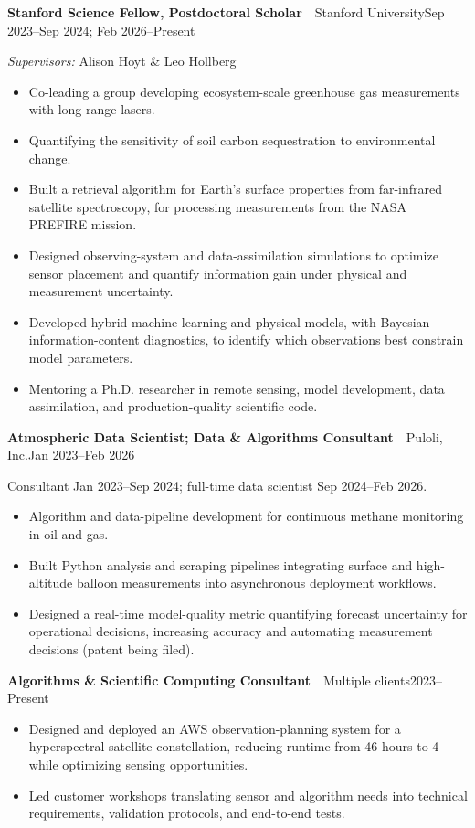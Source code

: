 \documentclass[11pt,letterpaper]{article}
\newcommand{\entry}[3]{\noindent\textbf{#1}~\textbar~#2\hfill{#3}\par}
\begin{document}
\entry{Stanford Science Fellow, Postdoctoral Scholar}{Stanford University}{Sep 2023--Sep 2024; Feb 2026--Present}
\textit{Supervisors:} Alison Hoyt \& Leo Hollberg
\begin{itemize}
  \item Co-leading a group developing ecosystem-scale greenhouse gas measurements with long-range lasers.
  \item Quantifying the sensitivity of soil carbon sequestration to environmental change.
  \item Built a retrieval algorithm for Earth's surface properties from far-infrared satellite spectroscopy, for processing measurements from the NASA PREFIRE mission.
  \item Designed observing-system and data-assimilation simulations to optimize sensor placement and quantify information gain under physical and measurement uncertainty.
  \item Developed hybrid machine-learning and physical models, with Bayesian information-content diagnostics, to identify which observations best constrain model parameters.
  \item Mentoring a Ph.D. researcher in remote sensing, model development, data assimilation, and production-quality scientific code.
\end{itemize}
\vspace{4pt}

\entry{Atmospheric Data Scientist; Data \& Algorithms Consultant}{Puloli, Inc.}{Jan 2023--Feb 2026}
Consultant Jan 2023--Sep 2024; full-time data scientist Sep 2024--Feb 2026.
\begin{itemize}
  \item Algorithm and data-pipeline development for continuous methane monitoring in oil and gas.
  \item Built Python analysis and scraping pipelines integrating surface and high-altitude balloon measurements into asynchronous deployment workflows.
  \item Designed a real-time model-quality metric quantifying forecast uncertainty for operational decisions, increasing accuracy and automating measurement decisions (patent being filed).
\end{itemize}
\vspace{4pt}

\entry{Algorithms \& Scientific Computing Consultant}{Multiple clients}{2023--Present}
\begin{itemize}
  \item Designed and deployed an AWS observation-planning system for a hyperspectral satellite constellation, reducing runtime from 46 hours to 4 while optimizing sensing opportunities.
  \item Led customer workshops translating sensor and algorithm needs into technical requirements, validation protocols, and end-to-end tests.
\end{itemize}
\vspace{4pt}
\end{document}
